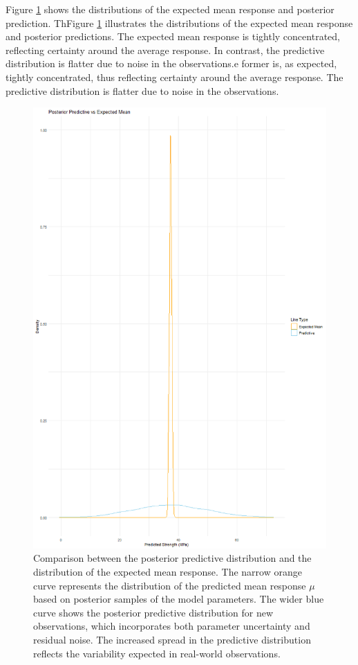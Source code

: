 \documentclass[]{article}
\begin{document}
Figure \ref{fig:img-post-mean-pred} shows the distributions of the expected mean response and posterior prediction. ThFigure \ref{fig:img-post-mean-pred} illustrates the distributions of the expected mean response and posterior predictions. The expected mean response is tightly concentrated, reflecting certainty around the average response. In contrast, the predictive distribution is flatter due to noise in the observations.e former is, as expected, tightly concentrated, thus reflecting certainty around the average response. The predictive distribution is flatter due to noise in the observations.

\begin{figure}[H]
	\centering
	\includegraphics[width=0.7\linewidth]{img/img-post-mean-pred}
	\caption{Comparison between the posterior predictive distribution and the distribution of the expected mean response. The narrow orange curve represents the distribution of the predicted mean response $\mu$ based on posterior samples of the model parameters. The wider blue curve shows the posterior predictive distribution for new observations, which incorporates both parameter uncertainty and residual noise. The increased spread in the predictive distribution reflects the variability expected in real-world observations.}
	\label{fig:img-post-mean-pred}
\end{figure}
\end{document}
